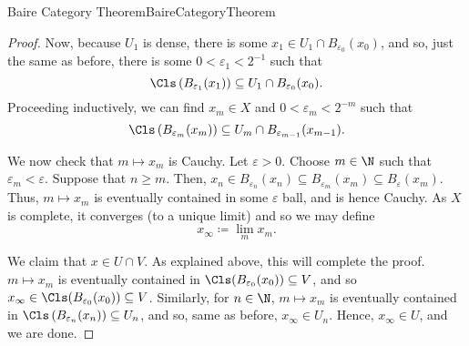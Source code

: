 \begin{thm}{Baire Category Theorem}{BaireCategoryTheorem}
\begin{proof}
Now, because $U_1$ is dense, there is some $x_1\in U_1\cap B_{\varepsilon _0}(x_0)$, and so, just the same as before, there is some $0<\varepsilon _1<2^{-1}$ such that
\begin{equation}
\Cls \left( B_{\varepsilon _1}(x_1)\right) \subseteq U_1\cap B_{\varepsilon _0}(x_0).
\end{equation}
Proceeding inductively, we can find $x_m\in X$ and $0<\varepsilon _m<2^{-m}$ such that
\begin{equation}
\Cls \left( B_{\varepsilon _m}(x_m)\right) \subseteq U_m\cap B_{\varepsilon _{m-1}}(x_{m-1}).
\end{equation}

We now check that $m\mapsto x_m$ is Cauchy.  Let $\varepsilon >0$.  Choose $m\in \N$ such that $\varepsilon _m<\varepsilon$.  Suppose that $n\geq m$.  Then, $x_n\in B_{\varepsilon _n}(x_n)\subseteq B_{\varepsilon _m}(x_m)\subseteq B_{\varepsilon}(x_m)$.  Thus, $m\mapsto x_m$ is eventually contained in some $\varepsilon$ ball, and is hence Cauchy.  As $X$ is complete, it converges (to a unique limit) and so we may define
\begin{equation}
x_\infty \coloneqq \lim _mx_m.
\end{equation}

We claim that $x\in U\cap V$.  As explained above, this will complete the proof.  $m\mapsto x_m$ is eventually contained in $\Cls (B_{\varepsilon _0}(x_0))\subseteq V$, and so $x_\infty \in \Cls (B_{\varepsilon _0}(x_0))\subseteq V$.  Similarly, for $n\in \N$, $m\mapsto x_m$ is eventually contained in $\Cls \left( B_{\varepsilon _n}(x_n)\right) \subseteq U_n$, and so, same as before, $x_\infty \in U_n$.  Hence, $x_\infty \in U$, and we are done.
\end{proof}
\end{thm}

